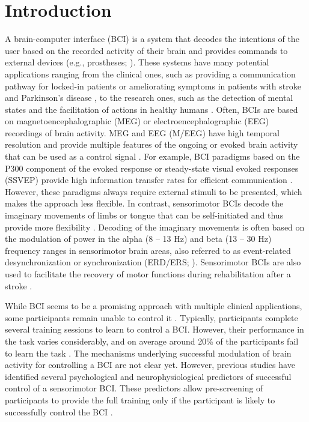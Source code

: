 \section{Introduction}

A brain-computer interface (BCI) is a system that decodes the intentions of the user based on the recorded activity of their brain and provides commands to external devices (e.g., prostheses; \cite{Wolpaw2002}). These systems have many potential applications ranging from the clinical ones, such as providing a communication pathway for locked-in patients \citep{Chaudhary2016} or ameliorating symptoms in patients with stroke and Parkinson's disease \citep{McFarland2017}, to the research ones, such as the detection of mental states and the facilitation of actions in healthy humans \citep{Blankertz2010review, Blankertz2016}. Often, BCIs are based on magnetoencephalographic (MEG) or electroencephalographic (EEG) recordings of brain activity. MEG and EEG (M/EEG) have high temporal resolution and provide multiple features of the ongoing or evoked brain activity that can be used as a control signal \citep{Abiri2019}. For example, BCI paradigms based on the P300 component of the evoked response or steady-state visual evoked responses (SSVEP) provide high information transfer rates for efficient communication \citep{Abiri2019}. However, these paradigms always require external stimuli to be presented, which makes the approach less flexible. In contrast, sensorimotor BCIs decode the imaginary movements of limbs or tongue that can be self-initiated and thus provide more flexibility \citep{Leeb2007, YuanHe2014, Scherer2018}. Decoding of the imaginary movements is often based on the modulation of power in the alpha (8 -- 13 Hz) and beta (13 -- 30 Hz) frequency ranges in sensorimotor brain areas, also referred to as event-related desynchronization or synchronization (ERD/ERS; \cite{PfurtschellerLopesDaSilva1999, Pfurtscheller1996}). Sensorimotor BCIs are also used to facilitate the recovery of motor functions during rehabilitation after a stroke \citep{Cervera2018, Kruse2020, Peng2022}.

\medskip

While BCI seems to be a promising approach with multiple clinical applications, some participants remain unable to control it \citep{AllisonNeuper2010}. Typically, participants complete several training sessions to learn to control a BCI. However, their performance in the task varies considerably, and on average around 20\% of the participants fail to learn the task \citep{Sannelli2019}. The mechanisms underlying successful modulation of brain activity for controlling a BCI are not clear yet. However, previous studies have identified several psychological \citep{Hammer2012, Jeunet2015} and neurophysiological \citep{Blankertz2010, Sugata2014, Samek2016, Vidaurre2020, Jorajuria2023} predictors of successful control of a sensorimotor BCI. These predictors allow pre-screening of participants to provide the full training only if the participant is likely to successfully control the BCI \citep{Sannelli2019}. 

